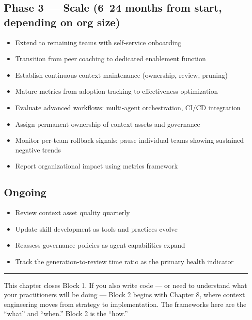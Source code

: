 \documentclass[
  a4paper,
  DIV=11,
  numbers=noendperiod]{scrreprt}
\providecommand{\tightlist}{%
  \setlength{\itemsep}{0pt}\setlength{\parskip}{0pt}}
\begin{document}
\subsection{Phase 3 --- Scale (6--24 months from start, depending on org
size)}\label{phase-3-scale-624-months-from-start-depending-on-org-size}

\begin{itemize}
\tightlist
\item[$\square$]
  Extend to remaining teams with self-service onboarding
\item[$\square$]
  Transition from peer coaching to dedicated enablement function
\item[$\square$]
  Establish continuous context maintenance (ownership, review, pruning)
\item[$\square$]
  Mature metrics from adoption tracking to effectiveness optimization
\item[$\square$]
  Evaluate advanced workflows: multi-agent orchestration, CI/CD
  integration
\item[$\square$]
  Assign permanent ownership of context assets and governance
\item[$\square$]
  Monitor per-team rollback signals; pause individual teams showing
  sustained negative trends
\item[$\square$]
  Report organizational impact using metrics framework
\end{itemize}

\subsection{Ongoing}\label{ongoing}

\begin{itemize}
\tightlist
\item[$\square$]
  Review context asset quality quarterly
\item[$\square$]
  Update skill development as tools and practices evolve
\item[$\square$]
  Reassess governance policies as agent capabilities expand
\item[$\square$]
  Track the generation-to-review time ratio as the primary health
  indicator
\end{itemize}

\begin{center}\rule{0.5\linewidth}{0.5pt}\end{center}

This chapter closes Block 1. If you also write code --- or need to
understand what your practitioners will be doing --- Block 2 begins with
Chapter 8, where context engineering moves from strategy to
implementation. The frameworks here are the ``what'' and ``when.'' Block
2 is the ``how.''
\end{document}
